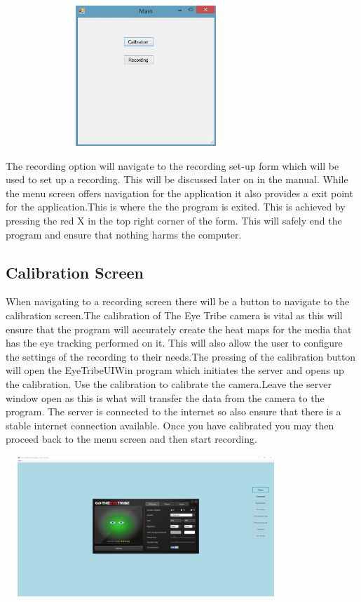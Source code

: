 \includegraphics[width=400px,height=200px]{./Images/Mainpage.JPG}

The recording option will navigate to the recording set-up form which will be used to set up a recording. This will be discussed later on in the manual. While the menu screen offers navigation for the application it also provides a exit point for the application.This is where the the program is exited. This is achieved by pressing the red X in the top right corner of the form. This will safely end the program and ensure that nothing harms the computer.
\fi
\subsection{Calibration Screen}
When navigating to a recording screen there will be a button to navigate to the calibration screen.The calibration of The Eye Tribe camera is vital as this will ensure that the program will accurately create the heat maps for the media that has the eye tracking performed on it. This will also allow the user to configure the settings of the recording to their needs.The pressing of the calibration button will open the EyeTribeUIWin program which initiates the server and opens up the calibration. Use the calibration to calibrate the camera.Leave the server window open as this is what will transfer the data from the camera to the program. The server is connected to the internet so also ensure that there is a stable internet connection available. Once you have calibrated you may then proceed back to the menu screen and then start recording.

\includegraphics[width=400px,height=200px]{./Images/EyeCalibration.PNG}\\

